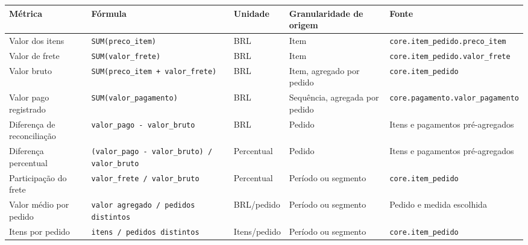\documentclass[12pt,a4paper]{article}
\newcounter{none}
\begin{document}
{\def\LTcaptype{none} %
\begin{longtable}[]{@{}
  >{\raggedright\arraybackslash}p{}
  >{\raggedright\arraybackslash}p{}
  >{\raggedright\arraybackslash}p{}
  >{\raggedright\arraybackslash}p{}
  >{\raggedright\arraybackslash}p{}@{}}
\toprule\noalign{}
\rowcolor{AzulCorporativo}
\begin{minipage}[b]{\linewidth}\raggedright\color{white}\bfseries
Métrica
\end{minipage} & \begin{minipage}[b]{\linewidth}\raggedright\color{white}\bfseries
Fórmula
\end{minipage} & \begin{minipage}[b]{\linewidth}\raggedright\color{white}\bfseries
Unidade
\end{minipage} & \begin{minipage}[b]{\linewidth}\raggedright\color{white}\bfseries
Granularidade de origem
\end{minipage} & \begin{minipage}[b]{\linewidth}\raggedright\color{white}\bfseries
Fonte
\end{minipage} \\
\midrule\noalign{}
\endhead
\bottomrule\noalign{}
\endlastfoot
Valor dos itens & \nolinkurl{SUM(preco_item)} & BRL & Item &
\nolinkurl{core.item_pedido.preco_item} \\
Valor de frete & \nolinkurl{SUM(valor_frete)} & BRL & Item &
\nolinkurl{core.item_pedido.valor_frete} \\
Valor bruto & \nolinkurl{SUM(preco_item + valor_frete)} & BRL & Item,
agregado por pedido & \nolinkurl{core.item_pedido} \\
Valor pago registrado & \nolinkurl{SUM(valor_pagamento)} & BRL &
Sequência, agregada por pedido &
\nolinkurl{core.pagamento.valor_pagamento} \\
Diferença de reconciliação & \nolinkurl{valor_pago - valor_bruto} & BRL
& Pedido & Itens e pagamentos pré-agregados \\
Diferença percentual &
\nolinkurl{(valor_pago - valor_bruto) / valor_bruto} & Percentual &
Pedido & Itens e pagamentos pré-agregados \\
Participação do frete & \nolinkurl{valor_frete / valor_bruto} &
Percentual & Período ou segmento & \nolinkurl{core.item_pedido} \\
Valor médio por pedido & \nolinkurl{valor agregado / pedidos distintos}
& BRL/pedido & Período ou segmento & Pedido e medida escolhida \\
Itens por pedido & \nolinkurl{itens / pedidos distintos} & Itens/pedido
& Período ou segmento & \nolinkurl{core.item_pedido} \\
\end{longtable}
}
\end{document}
